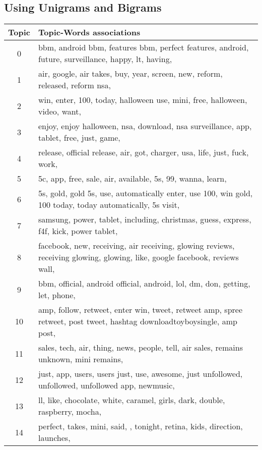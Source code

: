 \subsection{Using Unigrams and Bigrams}
\label{sec:using_bigrams}
\begin{table}
  \begin{tabular}{c p{16cm}} \toprule
    Topic & Topic-Words associations \\ \midrule
    0     & bbm, android bbm, features bbm, perfect features, android, future, surveillance, happy, lt, having, \\ \midrule
    1     & air, google, air takes, buy, year, screen, new, reform, released, reform nsa, \\ \midrule
    2     & win, enter, 100, today, halloween use, mini, free, halloween, video, want, \\ \midrule
    3     & enjoy, enjoy halloween, nsa, download, nsa surveillance, app, tablet, free, just, game, \\ \midrule
    4     & release, official release, air, got, charger, usa, life, just, fuck, work, \\ \midrule
    5     & 5c, app, free, sale, air, available, 5s, 99, wanna, learn, \\ \midrule
    6     & 5s, gold, gold 5s, use, automatically enter, use 100, win gold, 100 today, today automatically, 5s visit, \\ \midrule
    7     & samsung, power, tablet, including, christmas, guess, express, f4f, kick, power tablet, \\ \midrule
    8     & facebook, new, receiving, air receiving, glowing reviews, receiving glowing, glowing, like, google facebook, reviews wall, \\ \midrule
    9     & bbm, official, android official, android, lol, dm, don, getting, let, phone, \\ \midrule
    10    & amp, follow, retweet, enter win, tweet, retweet amp, spree retweet, post tweet, hashtag downloadtoyboysingle, amp post, \\ \midrule
    11    & sales, tech, air, thing, news, people, tell, air sales, remains unknown, mini remains, \\ \midrule
    12    & just, app, users, users just, use, awesome, just unfollowed, unfollowed, unfollowed app, newmusic, \\ \midrule
    13    & ll, like, chocolate, white, caramel, girls, dark, double, raspberry, mocha, \\ \midrule
    14    & perfect, takes, mini, said, , tonight, retina, kids, direction, launches, \\ \midrule

\end{tabular}
\end{table}

